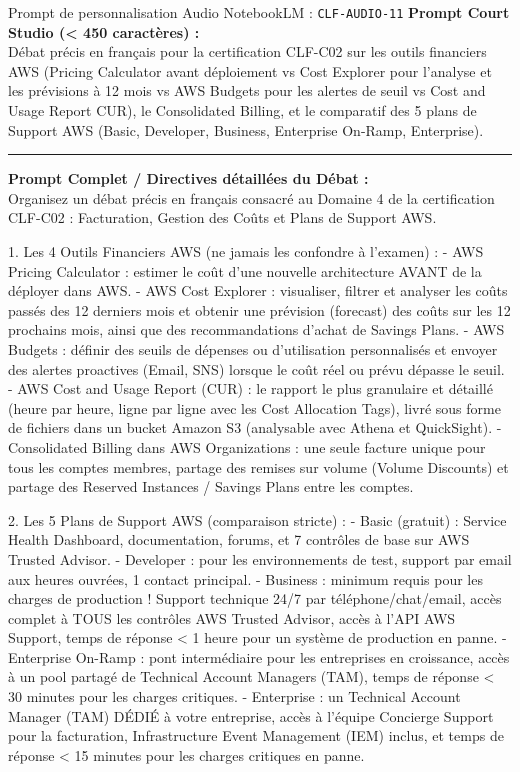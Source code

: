 \documentclass[11pt,a4paper]{article}
\begin{document}
\begin{promptbox}{Prompt de personnalisation Audio NotebookLM : \texttt{CLF-AUDIO-11}}
\textbf{Prompt Court Studio (< 450 caractères) :}\\
Débat précis en français pour la certification CLF-C02 sur les outils financiers AWS (Pricing Calculator avant déploiement vs Cost Explorer pour l'analyse et les prévisions à 12 mois vs AWS Budgets pour les alertes de seuil vs Cost and Usage Report CUR), le Consolidated Billing, et le comparatif des 5 plans de Support AWS (Basic, Developer, Business, Enterprise On-Ramp, Enterprise).

\medskip\hrule\medskip
\textbf{Prompt Complet / Directives détaillées du Débat :}\\
Organisez un débat précis en français consacré au Domaine 4 de la certification CLF-C02 : Facturation, Gestion des Coûts et Plans de Support AWS.

1. Les 4 Outils Financiers AWS (ne jamais les confondre à l'examen) :
- AWS Pricing Calculator : estimer le coût d'une nouvelle architecture AVANT de la déployer dans AWS.
- AWS Cost Explorer : visualiser, filtrer et analyser les coûts passés des 12 derniers mois et obtenir une prévision (forecast) des coûts sur les 12 prochains mois, ainsi que des recommandations d'achat de Savings Plans.
- AWS Budgets : définir des seuils de dépenses ou d'utilisation personnalisés et envoyer des alertes proactives (Email, SNS) lorsque le coût réel ou prévu dépasse le seuil.
- AWS Cost and Usage Report (CUR) : le rapport le plus granulaire et détaillé (heure par heure, ligne par ligne avec les Cost Allocation Tags), livré sous forme de fichiers dans un bucket Amazon S3 (analysable avec Athena et QuickSight).
- Consolidated Billing dans AWS Organizations : une seule facture unique pour tous les comptes membres, partage des remises sur volume (Volume Discounts) et partage des Reserved Instances / Savings Plans entre les comptes.

2. Les 5 Plans de Support AWS (comparaison stricte) :
- Basic (gratuit) : Service Health Dashboard, documentation, forums, et 7 contrôles de base sur AWS Trusted Advisor.
- Developer : pour les environnements de test, support par email aux heures ouvrées, 1 contact principal.
- Business : minimum requis pour les charges de production ! Support technique 24/7 par téléphone/chat/email, accès complet à TOUS les contrôles AWS Trusted Advisor, accès à l'API AWS Support, temps de réponse < 1 heure pour un système de production en panne.
- Enterprise On-Ramp : pont intermédiaire pour les entreprises en croissance, accès à un pool partagé de Technical Account Managers (TAM), temps de réponse < 30 minutes pour les charges critiques.
- Enterprise : un Technical Account Manager (TAM) DÉDIÉ à votre entreprise, accès à l'équipe Concierge Support pour la facturation, Infrastructure Event Management (IEM) inclus, et temps de réponse < 15 minutes pour les charges critiques en panne.
\end{promptbox}
\end{document}
